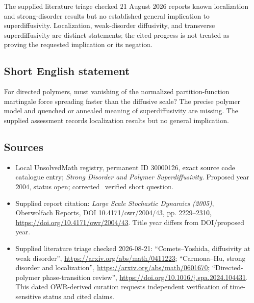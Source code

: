 \documentclass[11pt]{article}
\begin{document}
The supplied literature triage checked 21 August 2026 reports known localization and strong-disorder results but no established general implication to superdiffusivity. Localization, weak-disorder diffusivity, and transverse superdiffusivity are distinct statements; the cited progress is not treated as proving the requested implication or its negation.
\subsection{Short English statement}
For directed polymers, must vanishing of the normalized partition-function martingale force spreading faster than the diffusive scale? The precise polymer model and quenched or annealed meaning of superdiffusivity are missing. The supplied assessment records localization results but no general implication.
\subsection{Sources}
\begin{itemize}
\item Local UnsolvedMath registry, permanent ID 30000126, exact source code catalogue entry; \emph{Strong Disorder and Polymer Superdiffusivity}. Proposed year 2004, status open; corrected\_verified short question.
\item Supplied report citation: \emph{Large Scale Stochastic Dynamics (2005)}, Oberwolfach Reports, DOI 10.4171/owr/2004/43, pp. 2229--2310, \url{https://doi.org/10.4171/owr/2004/43}. Title year differs from DOI/proposed year.
\item Supplied literature triage checked 2026-08-21: ``Comets--Yoshida, diffusivity at weak disorder'', \url{https://arxiv.org/abs/math/0411223}; ``Carmona--Hu, strong disorder and localization'', \url{https://arxiv.org/abs/math/0601670}; ``Directed-polymer phase-transition review'', \url{https://doi.org/10.1016/j.spa.2024.104431}. This dated OWR-derived curation requests independent verification of time-sensitive status and cited claims.
\end{itemize}
\end{document}
